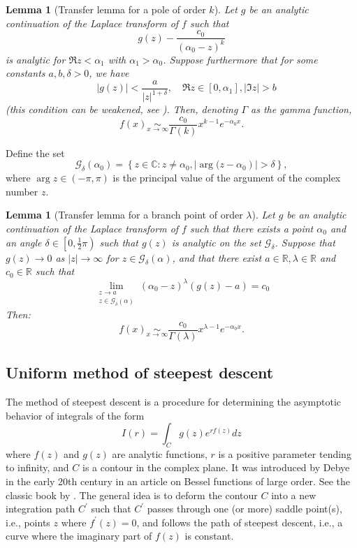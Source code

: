 \documentclass[11pt]{article}
\newcommand{\citet}[2][]{%
  \if\relax\detokenize{#1}\relax
    \cite{#2}%
  \else
    \cite[#1]{#2}%
  \fi
}
\newtheorem{lemme}[thm]{Lemma}
\theoremstyle{definition}
\begin{document}
\begin{lemme}[Transfer lemma for a pole of order $k$] 
\label{pr}
Let $g$ be an analytic continuation of the Laplace transform of $f$ such that
$$g(z) - \frac{c_0}{(\alpha_0 -z)^k}$$
is analytic for $\Re z < \alpha_1$ with $\alpha_1 > \alpha_0$. Suppose furthermore that for some constants $a, b, \delta>0$,
we have 
$$\quad|g(z)|<\frac{a}{|z|^{1+\delta}}, \quad \Re z \in\left[0, \alpha_1\right],|\Im z|>b$$
(this condition can be weakened, see \cite[Appendix C]{dai_reflecting_2011}).
Then, denoting $\Gamma$ as the gamma function,
$$ f(x)  \underset{x \to \infty}{\sim} \frac{c_0}{\Gamma (k)} x^{k-1} e^{- \alpha_0 x}.  $$
\end{lemme}
Define the set
$$\mathcal{G}_\delta\left(\alpha_0\right) =\left\{z \in \mathbb{C}: z \neq \alpha_0, \mid \arg (z-\left.\alpha_0\right) \mid>\delta\right\},$$ 
where $\arg z \in(-\pi, \pi)$ is the principal value of the argument of the complex number $z$.
\begin{lemme}[Transfer lemma for a branch point of order $\lambda$] 
\label{prbr}
Let $g$ be an analytic continuation of the Laplace transform of $f$ such that there exists a point $\alpha_0$ and an angle $\delta \in\left[0, \frac{1}{2} \pi\right)$ such that $g(z)$ is analytic on the set $\mathcal{G}_\delta$.
Suppose that $g(z) \rightarrow 0$ as $|z| \rightarrow \infty$ for $z \in \mathcal{G}_\delta(\alpha)$,
and that there exist $a \in \mathbb{R}, \lambda \in \mathbb{R}$ and $c_0 \in \mathbb{R}$ such that
$$
\lim _{\substack{z \rightarrow a \\ z \in \mathcal{G}_\delta(\alpha)}}(\alpha_0-z)^\lambda(g(z)-a)=c_0
$$
Then:
$$ f(x)  \underset{x \to \infty}{\sim} \frac{c_0}{\Gamma (\lambda)} x^{\lambda-1} e^{- \alpha_0 x}.  $$
\end{lemme}


\subsection{Uniform method of steepest descent}

The method of steepest descent is a procedure for determining the asymptotic behavior of integrals of the form
$$
I(r)=\int_C g(z) e^{r f(z)} d z
$$
where $f(z)$ and $g(z)$ are analytic functions, $r$ is a positive parameter tending to infinity, and $C$ is a contour in the complex plane. It was introduced by Debye in the early 20th century in an article on Bessel functions of large order. See the classic book by \citet{fedoryuk_asymptotic_1989}. The general idea is to deform the contour $C$ into a new integration path $C^{\prime}$ such that $C^{\prime}$ passes through one (or more) saddle point(s), i.e., points $z$ where $f^{\prime}(z)=0$, and follows the path of steepest descent, i.e., a curve where the imaginary part of $f(z)$ is constant.
\end{document}
